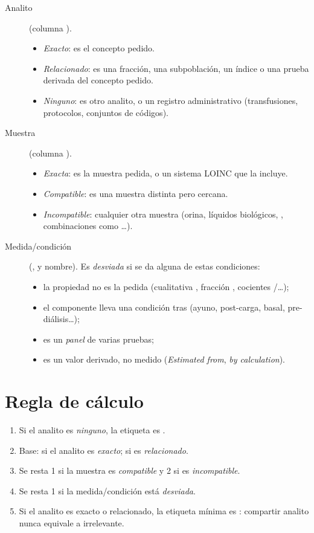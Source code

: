 \documentclass[11pt,a4paper]{article}
\begin{document}
\begin{description}
\item[Analito] (columna ).
  \begin{itemize}
  \item \emph{Exacto}: es el concepto pedido.
  \item \emph{Relacionado}: es una fracción, una subpoblación, un índice o una prueba derivada del concepto pedido.
  \item \emph{Ninguno}: es otro analito, o un registro administrativo (transfusiones, protocolos, conjuntos de códigos).
  \end{itemize}
\item[Muestra] (columna ).
  \begin{itemize}
  \item \emph{Exacta}: es la muestra pedida, o un sistema LOINC que la incluye.
  \item \emph{Compatible}: es una muestra distinta pero cercana.
  \item \emph{Incompatible}: cualquier otra muestra (orina, líquidos biológicos, , combinaciones como \ldots).
  \end{itemize}
\item[Medida/condición] (,  y nombre). Es \emph{desviada} si se da alguna de estas condiciones:
  \begin{itemize}
  \item la propiedad no es la pedida (cualitativa , fracción , cocientes /\ldots);
  \item el componente lleva una condición tras \code{\^{}} (ayuno, post-carga, basal, pre-diálisis\ldots);
  \item es un \emph{panel} de varias pruebas;
  \item es un valor derivado, no medido (\emph{Estimated from}, \emph{by calculation}).
  \end{itemize}
\end{description}

\section{Regla de cálculo}

\begin{enumerate}
\item Si el analito es \emph{ninguno}, la etiqueta es .
\item Base:  si el analito es \emph{exacto};  si es \emph{relacionado}.
\item Se resta 1 si la muestra es \emph{compatible} y 2 si es \emph{incompatible}.
\item Se resta 1 si la medida/condición está \emph{desviada}.
\item Si el analito es exacto o relacionado, la etiqueta mínima es : compartir analito nunca equivale a irrelevante.
\end{enumerate}
\end{document}
